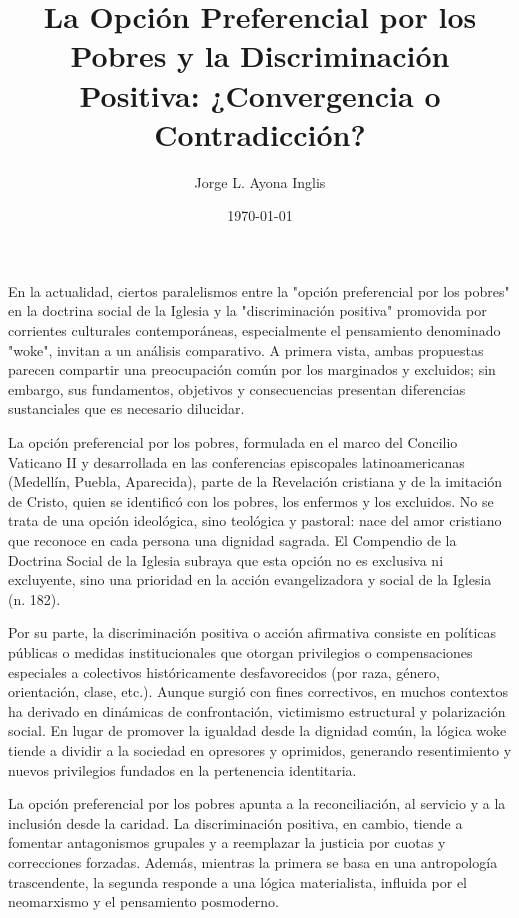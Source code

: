 \documentclass[12pt]{article}
\title{La Opción Preferencial por los Pobres y la Discriminación Positiva: ¿Convergencia o Contradicción?}
\author{Jorge L. Ayona Inglis}
\date{\today}
\begin{document}
\maketitle
\onehalfspacing

En la actualidad, ciertos paralelismos entre la "opción preferencial por los pobres" en la doctrina social de la Iglesia y la "discriminación positiva" promovida por corrientes culturales contemporáneas, especialmente el pensamiento denominado "woke", invitan a un análisis comparativo. A primera vista, ambas propuestas parecen compartir una preocupación común por los marginados y excluidos; sin embargo, sus fundamentos, objetivos y consecuencias presentan diferencias sustanciales que es necesario dilucidar.

La opción preferencial por los pobres, formulada en el marco del Concilio Vaticano II y desarrollada en las conferencias episcopales latinoamericanas (Medellín, Puebla, Aparecida), parte de la Revelación cristiana y de la imitación de Cristo, quien se identificó con los pobres, los enfermos y los excluidos. No se trata de una opción ideológica, sino teológica y pastoral: nace del amor cristiano que reconoce en cada persona una dignidad sagrada. El Compendio de la Doctrina Social de la Iglesia subraya que esta opción no es exclusiva ni excluyente, sino una prioridad en la acción evangelizadora y social de la Iglesia (n. 182)\cite{compendio}.

Por su parte, la discriminación positiva o acción afirmativa consiste en políticas públicas o medidas institucionales que otorgan privilegios o compensaciones especiales a colectivos históricamente desfavorecidos (por raza, género, orientación, clase, etc.). Aunque surgió con fines correctivos, en muchos contextos ha derivado en dinámicas de confrontación, victimismo estructural y polarización social. En lugar de promover la igualdad desde la dignidad común, la lógica woke tiende a dividir a la sociedad en opresores y oprimidos, generando resentimiento y nuevos privilegios fundados en la pertenencia identitaria\cite{woke}.

La opción preferencial por los pobres apunta a la reconciliación, al servicio y a la inclusión desde la caridad. La discriminación positiva, en cambio, tiende a fomentar antagonismos grupales y a reemplazar la justicia por cuotas y correcciones forzadas. Además, mientras la primera se basa en una antropología trascendente, la segunda responde a una lógica materialista, influida por el neomarxismo y el pensamiento posmoderno.
\end{document}
